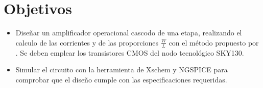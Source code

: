 \section{Objetivos \label{sec:obj}}


\begin{itemize} 
	\item Diseñar un amplificador operacional cascodo de una etapa, realizando el calculo de las corrientes y de las proporciones $\frac{W}{L}$ con el método propuesto por \cite{Allen_2012}. Se deben emplear los transistores CMOS del nodo tecnológico SKY130.
	\item Simular el circuito con la herramienta de Xschem y NGSPICE para comprobar que el diseño cumple con las especificaciones requeridas.	
\end{itemize}